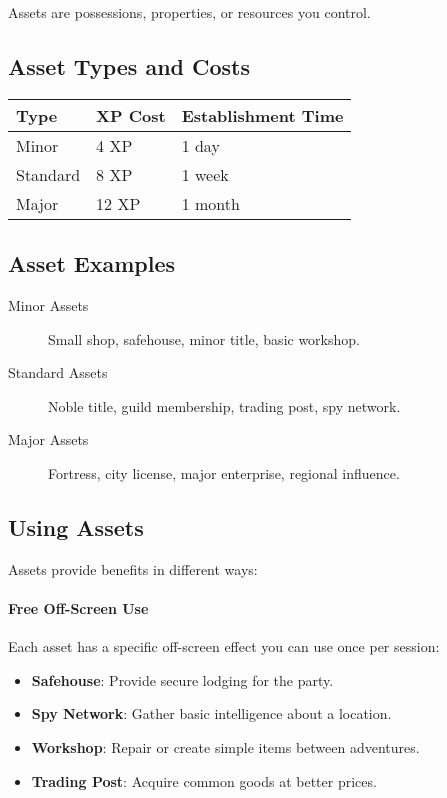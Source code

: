 \begin{multicols}{2}
Assets are possessions, properties, or resources you control.

\subsection*{Asset Types and Costs}
\begin{center}
\small
\begin{tabular}{lll}
\toprule
\textbf{Type} & \textbf{XP Cost} & \textbf{Establishment Time} \\
\midrule
Minor   & 4 XP  & 1 day \\
Standard& 8 XP  & 1 week \\
Major   & 12 XP & 1 month \\
\bottomrule
\end{tabular}
\end{center}

\subsection*{Asset Examples}
\begin{description}
\item[Minor Assets] Small shop, safehouse, minor title, basic workshop.
\item[Standard Assets] Noble title, guild membership, trading post, spy network.
\item[Major Assets] Fortress, city license, major enterprise, regional influence.
\end{description}

\subsection*{Using Assets}
Assets provide benefits in different ways:

\paragraph{Free Off-Screen Use}
Each asset has a specific off-screen effect you can use once per session:
\begin{itemize}
\item \textbf{Safehouse}: Provide secure lodging for the party.
\item \textbf{Spy Network}: Gather basic intelligence about a location.
\item \textbf{Workshop}: Repair or create simple items between adventures.
\item \textbf{Trading Post}: Acquire common goods at better prices.
\end{itemize}


\end{multicols}
